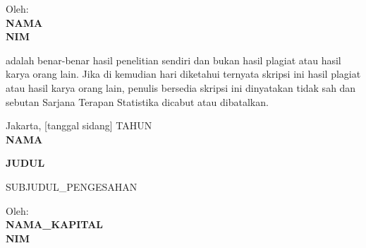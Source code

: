 \begin{titlepage}
\begin{center}
Oleh:\\[0.2cm]
\textbf{\MakeUppercase{{{NAMA}}}}\\
\textbf{{{NIM}}}
\end{center}
\vspace{1.2cm}

\noindent\justifying adalah benar-benar hasil penelitian sendiri dan bukan hasil plagiat
atau hasil karya orang lain. Jika di kemudian hari diketahui ternyata skripsi ini hasil
plagiat atau hasil karya orang lain, penulis bersedia skripsi ini dinyatakan tidak sah
dan sebutan Sarjana Terapan Statistika dicabut atau dibatalkan.
\vspace{1.5cm}

\begin{flushright}
\begin{minipage}{7cm}\centering
Jakarta, [tanggal sidang] {{TAHUN}}\\[2.2cm]
\textbf{{{NAMA}}}
\end{minipage}
\end{flushright}
\clearpage

\thispagestyle{empty}
\begin{center}{\bfseries\large \MakeUppercase{{{JUDUL}}}}\end{center}
{{SUBJUDUL_PENGESAHAN}}
\vspace{0.6cm}
\begin{center}Oleh:\\[0.2cm]\textbf{{{NAMA_KAPITAL}}}\\ \textbf{{{NIM}}}\end{center}
\vspace{0.8cm}

\begingroup
\small
\newcommand{\ttdblok}[3]{%
  \begin{minipage}[t]{0.5\textwidth}\centering
  \begin{minipage}[t][2.2\baselineskip][t]{\linewidth}\centering #1\end{minipage}\\[2cm]
  \textbf{#2}\\
  NIP #3
  \end{minipage}%
}


\end{titlepage}
